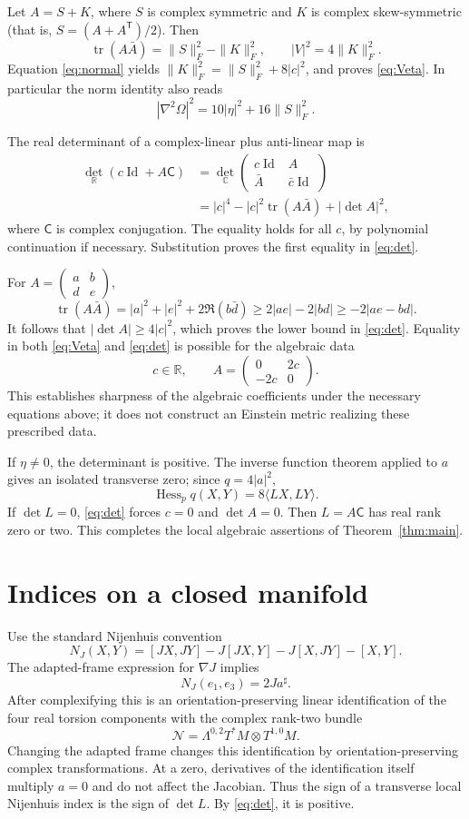 \documentclass[11pt]{article}
\theoremstyle{remark}\newtheorem{remark}[theorem]{Remark}
\newcommand{\tr}{\operatorname{tr}}
\newcommand{\Id}{\operatorname{Id}}
\begin{document}
Let $A=S+K$, where $S$ is complex symmetric and $K$ is complex skew-symmetric
(that is, $S=(A+A^{\mathsf T})/2$). Then
\[
 \tr(A\bar A)=\|S\|_F^2-\|K\|_F^2,
 \qquad |V|^2=4\|K\|_F^2.
\]
Equation \eqref{eq:normal} yields
$\|K\|_F^2=\|S\|_F^2+8|c|^2$, and proves \eqref{eq:Veta}.
In particular the norm identity also reads
\[
 |\nabla^2\Omega|^2=10|\eta|^2+16\|S\|_F^2.
\]

The real determinant of a complex-linear plus anti-linear map is
\begin{align*}
 \det_{\mathbb R}(c\Id+A\mathsf C)
 &=\det_{\mathbb C}
       \begin{pmatrix}c\Id&A\\\bar A&\bar c\Id\end{pmatrix}\\
 &=|c|^4-|c|^2\tr(A\bar A)+|\det A|^2,
\end{align*}
where $\mathsf C$ is complex conjugation. The equality holds for all
$c$, by polynomial continuation if necessary. Substitution proves the
first equality in \eqref{eq:det}.

For $A=\left(\begin{smallmatrix}a&b\\d&e\end{smallmatrix}\right)$,
\[
 \tr(A\bar A)=|a|^2+|e|^2+2\Re(b\bar d)
 \ge2|ae|-2|bd|\ge-2|ae-bd|.
\]
It follows that $|\det A|\ge4|c|^2$, which proves the lower bound in
\eqref{eq:det}. Equality in both \eqref{eq:Veta} and \eqref{eq:det}
is possible for the algebraic data
\[
 c\in\mathbb R,\qquad A=\begin{pmatrix}0&2c\\-2c&0\end{pmatrix}.
\]
This establishes sharpness of the algebraic coefficients under the
necessary equations above; it does not construct an Einstein metric
realizing these prescribed data.

If $\eta\ne0$, the determinant is positive. The inverse function theorem
applied to $a$ gives an isolated transverse zero; since $q=4|a|^2$,
\[
 \operatorname{Hess}_p q(X,Y)=8\langle LX,LY\rangle.
\]
If $\det L=0$, \eqref{eq:det} forces $c=0$ and $\det A=0$.
Then $L=A\mathsf C$ has real rank zero or two. This completes the local
algebraic assertions of Theorem~\ref{thm:main}.

\section{Indices on a closed manifold}
Use the standard Nijenhuis convention
\[
 N_J(X,Y)=[JX,JY]-J[JX,Y]-J[X,JY]-[X,Y].
\]
The adapted-frame expression for $\nabla J$ implies
\[
 N_J(e_1,e_3)=2J a^\sharp.
\]
After complexifying this is an orientation-preserving linear
identification of the four real torsion components with the complex
rank-two bundle
\[
 \mathcal N=\Lambda^{0,2}T^*M\otimes T^{1,0}M.
\]
Changing the adapted frame changes this identification by
orientation-preserving complex transformations. At a zero, derivatives
of the identification itself multiply $a=0$ and do not affect the
Jacobian. Thus the sign of a transverse local Nijenhuis index is the
sign of $\det L$. By \eqref{eq:det}, it is positive.
\end{document}
